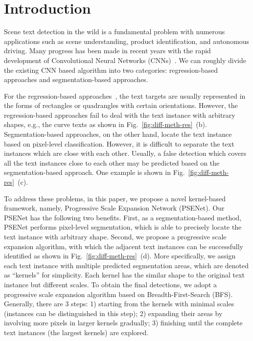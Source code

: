 \documentclass[10pt,twocolumn,letterpaper]{article}
\begin{document}
\section{Introduction}
	Scene text detection in the wild is a fundamental problem with numerous applications such as scene understanding, product identification, and autonomous driving. Many progress has been made in recent years with the rapid development of Convolutional Neural Networks (CNNs)~\cite{he2016deep,huang2017densely,ren2015faster}. We can roughly divide the existing CNN based algorithm into two categories: regression-based approaches and segmentation-based approaches.
	
	For the regression-based approaches~\cite{tian2016detecting, zhou2017east, shi2017detecting, jiang2017r2cnn, zhong2016deeptext, liu2018fots, he2017single, hu2017wordsup, lyu2018multi}, the text targets are usually represented in the forms of rectangles or quadrangles with certain orientations. However, the regression-based approaches fail to deal with the text instance with arbitrary shapes, e.g., the curve texts as shown in Fig.~\ref{fig:diff-meth-res}~(b). Segmentation-based approaches, on the other hand, locate the text instance based on pixel-level classification. However, it is difficult to separate the text instances which are close with each other. Usually, a false detection which covers all the text instances close to each other may be predicted based on the segmentation-based approach. One example is shown in Fig.~\ref{fig:diff-meth-res}~(c).
	
	To address these problems, in this paper, we propose a novel kernel-based framework, namely, Progressive Scale Expansion Network (PSENet). Our PSENet has the following two benefits. First, as a segmentation-based method, PSENet performs pixel-level segmentation, which is able to precisely locate the text instance with arbitrary shape. Second, we propose a progressive scale expansion algorithm, with which the adjacent text instances can be successfully identified as shown in Fig.~\ref{fig:diff-meth-res}~(d). More specifically, we assign each text instance with multiple predicted segmentation areas, which are denoted as ``kernels'' for simplicity.  Each kernel has the similar shape to the original text instance but different scales. To obtain the final detections, we adopt a progressive scale expansion algorithm based on Breadth-First-Search (BFS). Generally, there are 3 steps: 1) starting from the kernels with minimal scales (instances can be distinguished in this step); 2) expanding their areas by involving more pixels in larger kernels gradually; 3) finishing until the complete text instances (the largest kernels) are explored.
	
\end{document}

